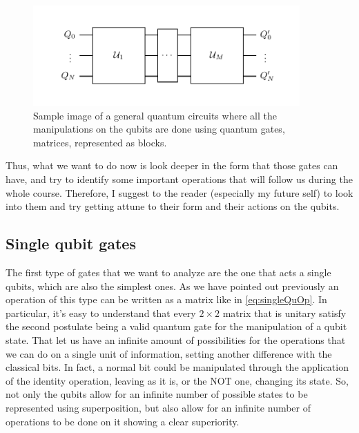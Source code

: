 \begin{figure}[b]
    \centering
    \includegraphics[width=0.91\textwidth]{Immagini/FirstQC.pdf}
    \caption{
        Sample image of a general quantum circuits where all the manipulations on the qubits are done using quantum gates, matrices, represented as blocks. 
    }
    \label{fig:FirstQC}
\end{figure}

Thus, what we want to do now is look deeper in the form that those gates can have, and try to identify some important operations that will follow us during the whole course. Therefore, I suggest to the reader (especially my future self) to look into them and try getting attune to their form and their actions on the qubits.

\subsection{Single qubit gates}

The first type of gates that we want to analyze are the one that acts a single qubits, which are also the simplest ones. As we have pointed out previously an operation of this type can be written as a matrix like in \eqref{eq:singleQuOp}. In particular, it's easy to understand that every $2\times 2$ matrix that is unitary satisfy the second postulate being a valid quantum gate for the manipulation of a qubit state. That let us have an infinite amount of possibilities for the operations that we can do on a single unit of information, setting another difference with the classical bits. In fact, a normal bit could be manipulated through the application of the identity operation, leaving as it is, or the NOT one, changing its state. So, not only the qubits allow for an infinite number of possible states to be represented using superposition, but also allow for an infinite number of operations to be done on it showing a clear superiority.

